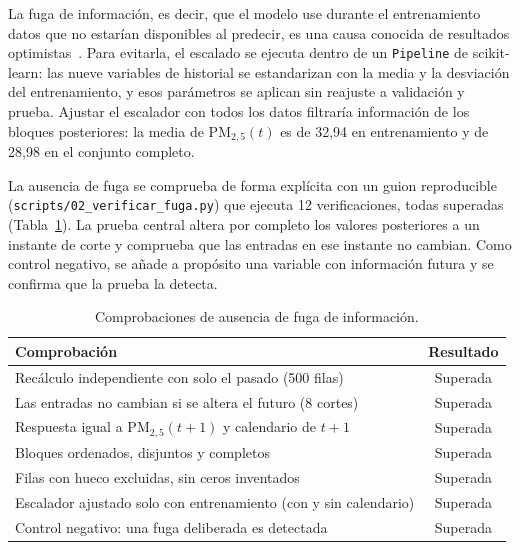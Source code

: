 La fuga de información, es decir, que el modelo use durante el entrenamiento datos que no estarían disponibles al predecir, es una causa conocida de resultados optimistas~\cite{kaufman2012}. Para evitarla, el escalado se ejecuta dentro de un \texttt{Pipeline} de scikit-learn: las nueve variables de historial se estandarizan con la media y la desviación del entrenamiento, y esos parámetros se aplican sin reajuste a validación y prueba. Ajustar el escalador con todos los datos filtraría información de los bloques posteriores: la media de $\mathrm{PM}_{2{,}5}(t)$ es de 32,94 en entrenamiento y de 28,98 en el conjunto completo.

La ausencia de fuga se comprueba de forma explícita con un guion reproducible (\texttt{scripts/02\_verificar\_fuga.py}) que ejecuta 12 verificaciones, todas superadas (Tabla~\ref{tab:fuga}). La prueba central altera por completo los valores posteriores a un instante de corte y comprueba que las entradas en ese instante no cambian. Como control negativo, se añade a propósito una variable con información futura y se confirma que la prueba la detecta.

\begin{table}[t]
\centering
\caption{Comprobaciones de ausencia de fuga de información.}
\label{tab:fuga}
\small
\begin{tabular}{@{}p{5.9cm}c@{}}
\toprule
Comprobación & Resultado \\
\midrule
Recálculo independiente con solo el pasado (500 filas) & Superada \\
Las entradas no cambian si se altera el futuro (8 cortes) & Superada \\
Respuesta igual a $\mathrm{PM}_{2{,}5}(t+1)$ y calendario de $t+1$ & Superada \\
Bloques ordenados, disjuntos y completos & Superada \\
Filas con hueco excluidas, sin ceros inventados & Superada \\
Escalador ajustado solo con entrenamiento (con y sin calendario) & Superada \\
Control negativo: una fuga deliberada es detectada & Superada \\
\bottomrule
\end{tabular}
\end{table}
